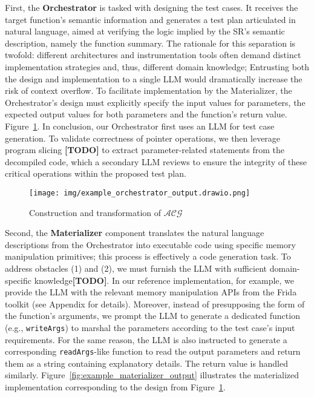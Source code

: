 \documentclass[acmsmall,screen,review,anonymous]{acmart} %
\begin{document}
First, the \textbf{Orchestrator} is tasked with designing the test cases.  It receives the target function's semantic information and generates a test plan articulated in natural language, aimed at verifying the logic implied by the SR's semantic description, namely the function summary. The rationale for this separation is twofold: different architectures and instrumentation tools often demand distinct implementation strategies and, thus, different domain knowledge; Entrusting both the design and implementation to a single LLM would dramatically increase the risk of context overflow. To facilitate implementation by the Materializer, the Orchestrator's design must explicitly specify the input values for parameters, the expected output values for both parameters and the function's return value. Figure~\ref{fig:example_orchestrator_output}. In conclusion, our Orchestrator first uses an LLM for test case generation. To validate  correctness of pointer operations, we then leverage program slicing \textbf{[TODO]} to extract parameter-related statements from the decompiled code, which a secondary LLM reviews to ensure the integrity of these critical operations within the proposed test plan.

\begin{figure}[h] %
    \centering
    \texttt{[image: img/example\_orchestrator\_output.drawio.png]} %
    \caption{Construction and transformation of $\mathcal{ACG}$} %
    \label{fig:example_orchestrator_output} %
\end{figure}

Second, the \textbf{Materializer} component translates the natural language descriptions from the Orchestrator into executable code using specific memory manipulation primitives; this process is effectively a code generation task. To address obstacles (1) and (2), we must furnish the LLM with sufficient domain-specific knowledge\textbf{[TODO]}. In our reference implementation, for example, we provide the LLM with the relevant memory manipulation APIs from the Frida toolkit (see Appendix for details). Moreover, instead of presupposing the form of the function's arguments, we prompt the LLM to generate a dedicated function (e.g., \texttt{writeArgs}) to marshal the parameters according to the test case's input requirements. For the same reason, the LLM is also instructed to generate a corresponding \texttt{readArgs}-like function to read the output parameters and return them as a string containing explanatory details. The return value is handled similarly. Figure~\ref{fig:example_materializer_output} illustrates the materialized implementation corresponding to the design from Figure~\ref{fig:example_orchestrator_output}.
\end{document}
